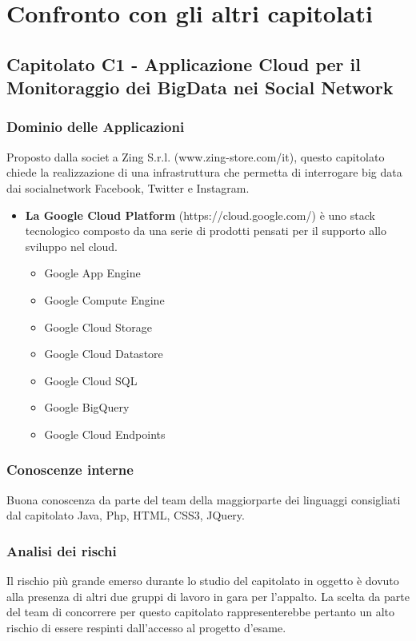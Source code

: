 \section{Confronto con gli altri capitolati}
\subsection{Capitolato C1 - Applicazione Cloud per il Monitoraggio dei
	BigData nei Social Network}
  \subsubsection{Dominio delle Applicazioni}
  Proposto dalla societa Zing S.r.l. (www.zing-store.com/it), questo capitolato chiede la realizzazione di una infrastruttura che permetta di interrogare big data dai socialnetwork Facebook, Twitter e Instagram.
  \begin{itemize}
  	\item \textbf{La Google Cloud Platform} (https://cloud.google.com/) è uno stack tecnologico composto da una serie di prodotti pensati per il supporto allo sviluppo nel cloud.
  	\begin{itemize}
  		\item Google App Engine
  		\item Google Compute Engine
        \item Google Cloud Storage
  		\item Google Cloud Datastore
  		\item Google Cloud SQL
  		\item Google BigQuery
  		\item Google Cloud Endpoints
  	\end{itemize}
  \end{itemize}
  \subsubsection{Conoscenze interne}
  Buona conoscenza da parte del team della maggiorparte dei linguaggi consigliati dal capitolato Java, Php, HTML, CSS3, JQuery.
  \subsubsection{Analisi dei rischi}
  Il rischio più grande emerso durante lo studio del capitolato in oggetto è dovuto alla presenza di altri due gruppi di lavoro in gara per l'appalto. La scelta da parte del team di concorrere per questo capitolato rappresenterebbe pertanto un alto rischio di essere respinti dall'accesso al progetto d'esame.
